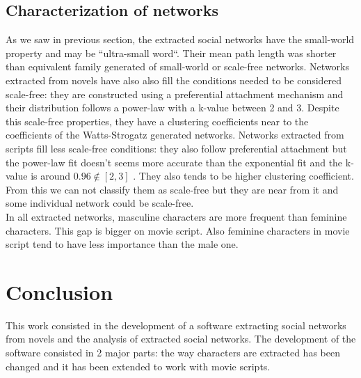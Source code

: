 \documentclass[a4paper, 12pt]{report}
\begin{document}
\section{Characterization of networks}
\label{char}

As we saw in previous section, the extracted social networks have the small-world property and may be ``ultra-small word``. Their mean path length was shorter than equivalent family generated of small-world or scale-free networks. Networks extracted from novels have also also fill the conditions needed to be considered scale-free: they are constructed using a preferential attachment mechanism and their distribution follows a power-law with a k-value between 2 and 3. Despite this scale-free properties, they have a clustering coefficients near to the coefficients of the Watts-Strogatz generated networks. Networks extracted from scripts fill less scale-free conditions: they also follow preferential attachment but the power-law fit doesn't seems more accurate than the exponential fit and the k-value is around $0.96 \notin [2,3]$ . They also tends to be higher clustering coefficient. From this we can not classify them as scale-free but they are near from it and some individual network could be scale-free.\\

In all extracted networks, masculine characters are more frequent than feminine characters. This gap is bigger on movie script. Also feminine characters in movie script tend to have less importance than the male one.



\chapter{Conclusion}
This work consisted in the development of a software extracting social networks from novels and the analysis of extracted social networks.
The development of the software consisted in 2 major parts: the way characters are extracted has been changed and it has been extended to work with movie scripts.\\
\end{document}
